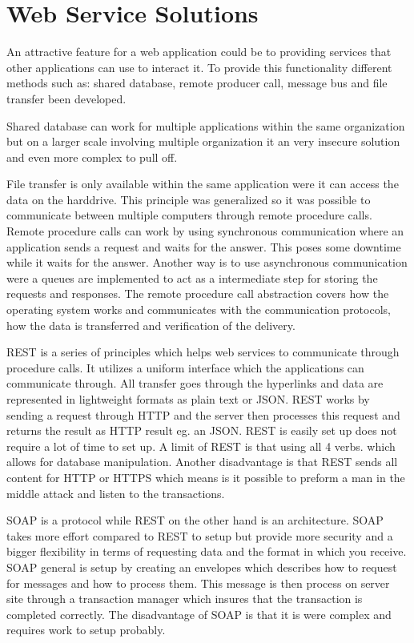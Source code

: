 \section{Web Service Solutions}
An attractive feature for a web application could be to providing services that other applications can use to interact it. To provide this functionality different methods such as: shared database, remote producer call, message bus and file transfer been developed.

Shared database can work for multiple applications within the same organization but on a larger scale involving multiple organization it an very insecure solution and even more complex to pull off.

File transfer is only available within the same application were it can access the data on the harddrive. This principle was generalized so it was possible to communicate between multiple computers through remote procedure calls. Remote procedure calls can work by using synchronous communication where an application sends a request and waits for the answer. This poses some downtime while it waits for the answer. Another way is to use asynchronous communication were a queues are implemented to act as a intermediate step for storing the requests and responses.
The remote procedure call abstraction covers how the operating system works and communicates with the communication protocols, how the data is transferred and verification of the delivery.

REST is a series of principles which helps web services to communicate through procedure calls. It utilizes a uniform interface which the applications can communicate through. All transfer goes through the hyperlinks and data are represented in lightweight formats as plain text or JSON. REST works by sending a request through HTTP and the server then processes this request and returns the result as HTTP result eg. an JSON. REST is easily set up does not require a lot of time to set up. A limit of REST is that using all 4 verbs. which allows for database manipulation. Another disadvantage is that REST sends all content for HTTP or HTTPS which means is it possible to preform a man in the middle attack and listen to the transactions.

SOAP is a protocol while REST on the other hand is an architecture. SOAP takes more effort compared to REST to setup but provide more security and a bigger flexibility in terms of requesting data and the format in which you receive. SOAP general is setup by creating an envelopes which describes how to request for messages and how to process them. This message is then process on server site through a transaction manager which insures that the transaction is completed correctly. The disadvantage of SOAP is that it is were complex and requires work to setup probably.